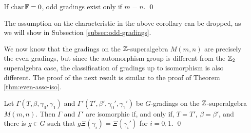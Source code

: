 \begin{cor}\label{cor:m=n}
	If $\operatorname{char} \mathbb{F} = 0$, odd gradings exist only if $m=n$. \qed
\end{cor}

The assumption on the characteristic in the above corollary can be dropped, as we will show in Subsection \ref{subsec:odd-gradings}.%

We now know that the gradings on the $\mathbb{Z}$-superalgebra $M(m,n)$ are precisely the even gradings, but since the automorphism group is different
from the $\mathbb{Z}_2$-superalgebra case, the classification of gradings up to isomorphism is also different. 
The proof of the next result is similar to the proof of Theorem \ref{thm:even-assc-iso}.

\begin{thm}
	Let $\Gamma(T,\beta,\gamma_0,\gamma_1)$ and $\Gamma'(T',\beta',\gamma_0',\gamma_1')$ be $G$-gradings on the $\mathbb{Z}$-superalgebra $M(m,n)$. Then $\Gamma$ and $\Gamma'$ are isomorphic if, and only if, $T=T'$, $\beta=\beta'$, and there is $g\in G$ such that $g\Xi (\gamma_i) = \Xi (\gamma_i')$ for $i=0,1$. \qed
\end{thm}


